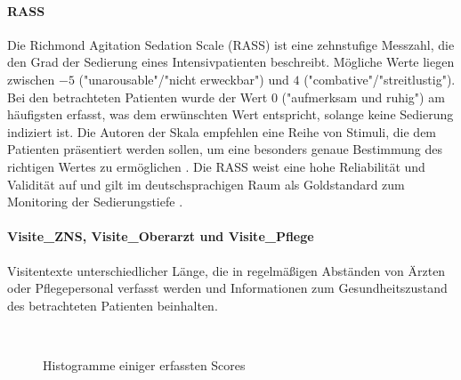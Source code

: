 \paragraph{RASS}
Die Richmond Agitation Sedation Scale (RASS) ist eine zehnstufige Messzahl, die den Grad der Sedierung eines Intensivpatienten beschreibt. Mögliche Werte liegen zwischen $-5$ ("unarousable"/"nicht erweckbar") und $4$ ("combative"/"streitlustig"). Bei den betrachteten Patienten wurde der Wert $0$ ("aufmerksam und ruhig") am häufigsten erfasst, was dem erwünschten Wert entspricht, solange keine Sedierung indiziert ist. Die Autoren der Skala empfehlen eine Reihe von Stimuli, die dem Patienten präsentiert werden sollen, um eine besonders genaue Bestimmung des richtigen Wertes zu ermöglichen \citep{sesslerRichmondAgitationSedation2002a}. Die RASS weist eine hohe Reliabilität und Validität auf und gilt im deutschsprachigen Raum als Goldstandard zum Monitoring der Sedierungstiefe \citep{marxIntensivmedizin2015c, muellerAnalgesieSedierungUnd2015}.


\paragraph{Visite\_ZNS, Visite\_Oberarzt und Visite\_Pflege}
Visitentexte unterschiedlicher Länge, die in regelmäßigen Abständen von Ärzten oder Pflegepersonal verfasst werden und Informationen zum Gesundheitszustand des betrachteten Patienten beinhalten.

\begin{figure}[htb]
    \captionsetup[subfigure]{labelformat=empty, justification=centering}

    \centering
     \qquad
     \\ %
     \qquad
    \caption{Histogramme einiger erfassten Scores}
    \label{fig:score_histograms}
\end{figure}

